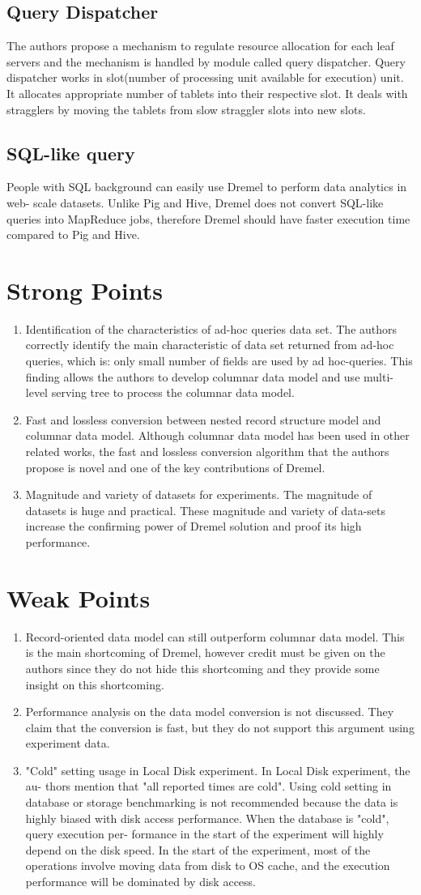 \documentclass[twocolumn]{article}
\newcommand{\be}{\begin{enumerate}}
\newcommand{\ee}{\end{enumerate}}
\newcommand{\ii}{\item}
\begin{document}
\subsection{Query Dispatcher}
The authors propose a mechanism to regulate resource allocation for each leaf servers and the mechanism is handled by module called query dispatcher. Query dispatcher works in slot(number of processing unit available for execution) unit. It allocates appropriate number of tablets into their respective slot. It deals with stragglers by moving the tablets from slow straggler slots into new slots.

\subsection{SQL-like query}
People with SQL background can easily use Dremel to perform data analytics in web- scale datasets. Unlike Pig and Hive, Dremel does not convert SQL-like queries into MapReduce jobs, therefore Dremel should have faster execution time compared to Pig and Hive.

\section{Strong Points}
\be
\ii Identification of the characteristics of ad-hoc queries data set.
The authors correctly identify the main characteristic of data set returned from ad-hoc queries, which is: only small number of fields are used by ad hoc-queries. This finding allows the authors to develop columnar data model and use multi-level serving tree to process the columnar data model.
\ii Fast and lossless conversion between nested record structure model and columnar data model.
Although columnar data model has been used in other related works, the fast and lossless conversion algorithm that the authors propose is novel and one of the key contributions of Dremel.
\ii Magnitude and variety of datasets for experiments.
The magnitude of datasets is huge and practical. These magnitude and variety of data-sets increase the confirming power of Dremel solution and proof its high performance.
\ee
\section{Weak Points}
\be
\ii Record-oriented data model can still outperform columnar data model. This is the main shortcoming of Dremel, however credit must be given on the authors since they do not hide this shortcoming and they provide some insight on this shortcoming.
\ii Performance analysis on the data model conversion is not discussed. They claim that the conversion is fast, but they do not support this argument using experiment data.
\ii "Cold" setting usage in Local Disk experiment. In Local Disk experiment, the au- thors mention that "all reported times are cold". Using cold setting in database or storage benchmarking is not recommended because the data is highly biased with disk access performance. When the database is "cold", query execution per- formance in the start of the experiment will highly depend on the disk speed. In the start of the experiment, most of the operations involve moving data from disk to OS cache, and the execution performance will be dominated by disk access.
\ee
\end{document}
